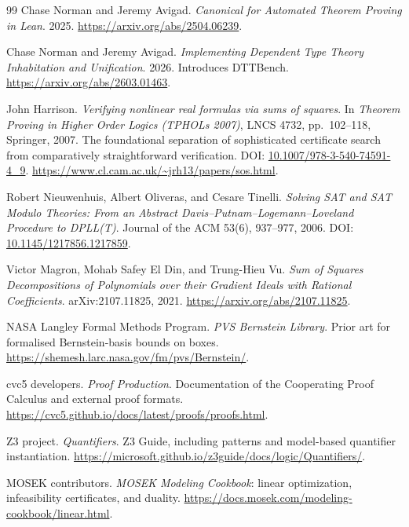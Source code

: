 \begin{thebibliography}{99}
Chase Norman and Jeremy Avigad. \emph{Canonical for Automated Theorem Proving
in Lean}. 2025.
\url{https://arxiv.org/abs/2504.06239}.

Chase Norman and Jeremy Avigad. \emph{Implementing Dependent Type Theory
Inhabitation and Unification}. 2026. Introduces DTTBench.
\url{https://arxiv.org/abs/2603.01463}.


John Harrison. \emph{Verifying nonlinear real formulas via sums of squares}.
In \emph{Theorem Proving in Higher Order Logics (TPHOLs 2007)}, LNCS 4732,
pp.~102--118, Springer, 2007. The foundational separation of sophisticated
certificate search from comparatively straightforward verification.
DOI: \href{https://doi.org/10.1007/978-3-540-74591-4_9}{10.1007/978-3-540-74591-4\_9}.
\url{https://www.cl.cam.ac.uk/~jrh13/papers/sos.html}.

Robert Nieuwenhuis, Albert Oliveras, and Cesare Tinelli. \emph{Solving SAT and
SAT Modulo Theories: From an Abstract Davis--Putnam--Logemann--Loveland
Procedure to DPLL(T)}. Journal of the ACM 53(6), 937--977, 2006.
DOI: \href{https://doi.org/10.1145/1217856.1217859}{10.1145/1217856.1217859}.

Victor Magron, Mohab Safey El Din, and Trung-Hieu Vu. \emph{Sum of Squares
Decompositions of Polynomials over their Gradient Ideals with Rational
Coefficients}. arXiv:2107.11825, 2021.
\url{https://arxiv.org/abs/2107.11825}.

NASA Langley Formal Methods Program. \emph{PVS Bernstein Library}. Prior art
for formalised Bernstein-basis bounds on boxes.
\url{https://shemesh.larc.nasa.gov/fm/pvs/Bernstein/}.

cvc5 developers. \emph{Proof Production}. Documentation of the Cooperating
Proof Calculus and external proof formats.
\url{https://cvc5.github.io/docs/latest/proofs/proofs.html}.

Z3 project. \emph{Quantifiers}. Z3 Guide, including patterns and model-based
quantifier instantiation.
\url{https://microsoft.github.io/z3guide/docs/logic/Quantifiers/}.

MOSEK contributors. \emph{MOSEK Modeling Cookbook}: linear optimization,
infeasibility certificates, and duality.
\url{https://docs.mosek.com/modeling-cookbook/linear.html}.


\end{thebibliography}
